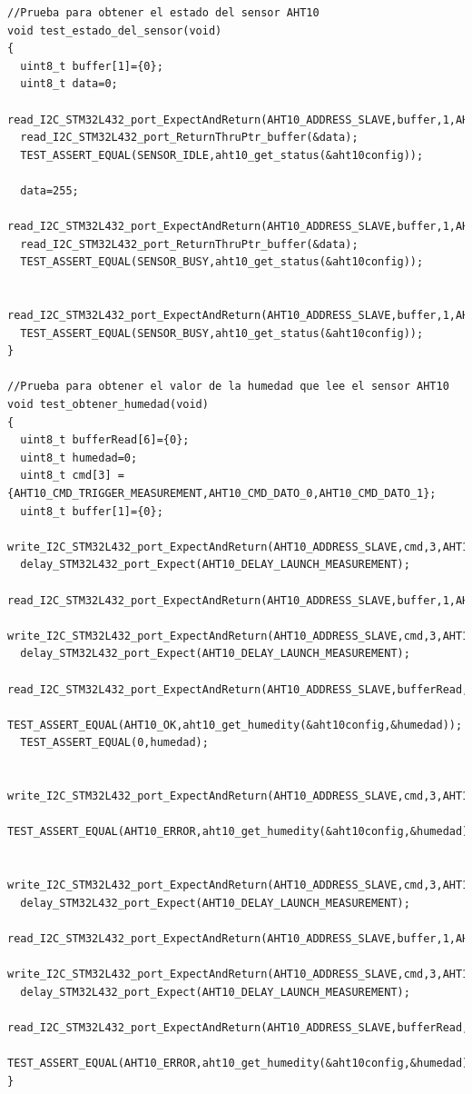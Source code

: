 \begin{lstlisting}[label=cod:codigo test driver AHT10,caption=Tests del driver sensor AHT10.] 
//Prueba para obtener el estado del sensor AHT10
void test_estado_del_sensor(void)
{
  uint8_t buffer[1]={0};
  uint8_t data=0;
  read_I2C_STM32L432_port_ExpectAndReturn(AHT10_ADDRESS_SLAVE,buffer,1,AHT10_OK);
  read_I2C_STM32L432_port_ReturnThruPtr_buffer(&data);
  TEST_ASSERT_EQUAL(SENSOR_IDLE,aht10_get_status(&aht10config));
  
  data=255;
  read_I2C_STM32L432_port_ExpectAndReturn(AHT10_ADDRESS_SLAVE,buffer,1,AHT10_OK);
  read_I2C_STM32L432_port_ReturnThruPtr_buffer(&data);
  TEST_ASSERT_EQUAL(SENSOR_BUSY,aht10_get_status(&aht10config));
  
  read_I2C_STM32L432_port_ExpectAndReturn(AHT10_ADDRESS_SLAVE,buffer,1,AHT10_ERROR);
  TEST_ASSERT_EQUAL(SENSOR_BUSY,aht10_get_status(&aht10config)); 
}

//Prueba para obtener el valor de la humedad que lee el sensor AHT10
void test_obtener_humedad(void)
{
  uint8_t bufferRead[6]={0};
  uint8_t humedad=0;
  uint8_t cmd[3] = {AHT10_CMD_TRIGGER_MEASUREMENT,AHT10_CMD_DATO_0,AHT10_CMD_DATO_1};
  uint8_t buffer[1]={0};
  write_I2C_STM32L432_port_ExpectAndReturn(AHT10_ADDRESS_SLAVE,cmd,3,AHT10_OK);
  delay_STM32L432_port_Expect(AHT10_DELAY_LAUNCH_MEASUREMENT);
  read_I2C_STM32L432_port_ExpectAndReturn(AHT10_ADDRESS_SLAVE,buffer,1,AHT10_OK);
  write_I2C_STM32L432_port_ExpectAndReturn(AHT10_ADDRESS_SLAVE,cmd,3,AHT10_OK);
  delay_STM32L432_port_Expect(AHT10_DELAY_LAUNCH_MEASUREMENT); 
  read_I2C_STM32L432_port_ExpectAndReturn(AHT10_ADDRESS_SLAVE,bufferRead,6,AHT10_OK);
  TEST_ASSERT_EQUAL(AHT10_OK,aht10_get_humedity(&aht10config,&humedad));
  TEST_ASSERT_EQUAL(0,humedad);

  write_I2C_STM32L432_port_ExpectAndReturn(AHT10_ADDRESS_SLAVE,cmd,3,AHT10_ERROR);
  TEST_ASSERT_EQUAL(AHT10_ERROR,aht10_get_humedity(&aht10config,&humedad));

  write_I2C_STM32L432_port_ExpectAndReturn(AHT10_ADDRESS_SLAVE,cmd,3,AHT10_OK);
  delay_STM32L432_port_Expect(AHT10_DELAY_LAUNCH_MEASUREMENT);
  read_I2C_STM32L432_port_ExpectAndReturn(AHT10_ADDRESS_SLAVE,buffer,1,AHT10_OK);
  write_I2C_STM32L432_port_ExpectAndReturn(AHT10_ADDRESS_SLAVE,cmd,3,AHT10_OK);
  delay_STM32L432_port_Expect(AHT10_DELAY_LAUNCH_MEASUREMENT); 
  read_I2C_STM32L432_port_ExpectAndReturn(AHT10_ADDRESS_SLAVE,bufferRead,6,AHT10_ERROR);
  TEST_ASSERT_EQUAL(AHT10_ERROR,aht10_get_humedity(&aht10config,&humedad));
}
\end{lstlisting}

